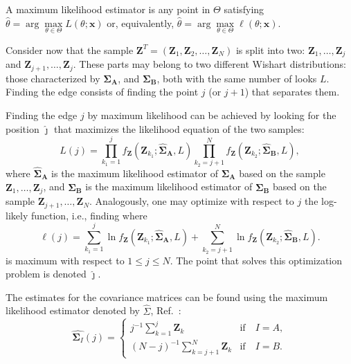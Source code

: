 \documentclass[conference]{IEEEtran}
\begin{document}
A maximum likelihood estimator is any point in $\Theta$ satisfying $\widehat{\theta}= \arg\max\limits_{\theta\in\Theta}L(\theta;\mathbf{x})$ or, equivalently, $\widehat{\theta}= \arg\max\limits_{\theta\in\Theta}\ell(\theta;\mathbf{x})$.

Consider now that the sample $\mathbf{Z}^T=(\mathbf{Z}_1,\mathbf{Z}_2,\dots,\mathbf{Z}_N)$ is split into two: $\mathbf{Z}_1,\dots,\mathbf{Z}_j$ and $\mathbf{Z}_{j+1},\dots,\mathbf{Z}_j$.
These parts may belong to two different Wishart distributions: those characterized by  $\mathbf{\Sigma_A}$, and $\mathbf{\Sigma_B}$, both with the same number of looks $L$.
Finding the edge consists of finding the point $j$ (or $j+1$) that separates them.

Finding the edge $j$ by maximum likelihood can be achieved by looking for the position $\widehat\jmath$  that maximizes the likelihood equation of the two samples:
%
\begin{equation}
	L(j)=\prod_{k_1=1}^{j}f_{\mathbf{Z}}(\mathbf{Z}_{k_1};\mathbf{\widehat\Sigma_{A}},L) \prod_{k_2=j+1}^{N}f_{\mathbf{Z}}(\mathbf{Z}_{k_2};\mathbf{\widehat\Sigma_{B}},L),
	\label{eq_06}
\end{equation}
where $\mathbf{\widehat\Sigma_{A}}$ is the maximum likelihood estimator of $\mathbf{\Sigma_{A}}$ based on the sample $\mathbf{Z}_1,\dots,\mathbf{Z}_{j}$, 
and $\mathbf{\widehat\Sigma_{B}}$ is the maximum likelihood estimator of $\mathbf{\Sigma_{B}}$ based on the sample $\mathbf{Z}_{j+1},\dots,\mathbf{Z}_{N}$.
Analogously, one may optimize with respect to $j$ the log-likely function, i.e., finding where
\begin{equation}
\ell(j) =
	\sum_{k_1=1}^{j}\ln f_{\mathbf{Z}}(\mathbf{Z}_{k_1}; \mathbf{\widehat\Sigma_{A}},L) + \sum_{k_2=j+1}^{N}\ln f_{\mathbf{Z}}(\mathbf{Z}_{k_2};     \mathbf{\widehat\Sigma_{B}},L).
	\label{eq_07}
\end{equation}
is maximum with respect to $1\leq j \leq N$.
The point that solves this optimization problem is denoted $\widehat{\jmath}$.

The estimates for the covariance matrices can be found using the maximum likelihood estimator denoted by $\widehat{\Sigma}$, Ref.~\cite{good}: 
\begin{equation}
\widehat{\mathbf\Sigma_{I}}(j) = \left\{
\begin{array}{lc}
	j^{-1}\sum_{k=1}^{j}\mathbf{Z}_{k}  & \mbox{if}\quad I=A,  \\
        (N-j)^{-1}\sum_{k=j+1}^{N}\mathbf{Z}_{k} & \mbox{if}\quad I=B.
\end{array}
\right.\label{eq_08}
\end{equation}
\end{document}
